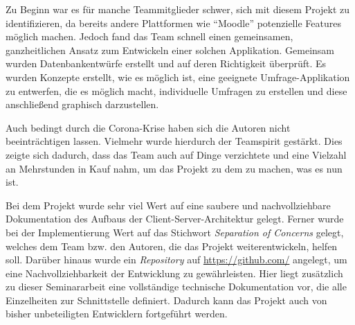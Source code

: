 Zu Beginn war es für manche Teammitglieder schwer, sich mit diesem Projekt zu identifizieren, da bereits andere Plattformen wie \enquote{Moodle} potenzielle Features möglich machen.
Jedoch fand das Team schnell einen gemeinsamen, ganzheitlichen Ansatz zum Entwickeln einer solchen Applikation.
Gemeinsam wurden Datenbankentwürfe erstellt und auf deren Richtigkeit überprüft.
Es wurden Konzepte erstellt, wie es möglich ist, eine geeignete Umfrage-Applikation zu entwerfen, die es möglich macht, individuelle Umfragen zu erstellen und diese anschließend graphisch darzustellen.

Auch bedingt durch die Corona-Krise haben sich die Autoren nicht beeinträchtigen lassen.
Vielmehr wurde hierdurch der Teamspirit gestärkt.
Dies zeigte sich \ua dadurch, dass das Team auch auf Dinge verzichtete und eine Vielzahl an Mehrstunden in Kauf nahm, um das Projekt zu dem zu machen, was es nun ist.

Bei dem Projekt wurde sehr viel Wert auf eine saubere und nachvollziehbare Dokumentation des Aufbaus der Client-Server-Architektur gelegt.
Ferner wurde bei der Implementierung Wert auf das Stichwort \emph{Separation of Concerns} gelegt, welches dem Team bzw. den Autoren, die das Projekt weiterentwickeln, helfen soll. 
Darüber hinaus wurde ein \emph{Repository} auf \url{https://github.com/} angelegt, um eine Nachvollziehbarkeit der Entwicklung zu gewährleisten.
Hier liegt zusätzlich zu dieser Seminararbeit eine vollständige technische Dokumentation vor, die alle Einzelheiten zur Schnittstelle definiert.
Dadurch kann das Projekt auch von bisher unbeteiligten Entwicklern fortgeführt werden.
